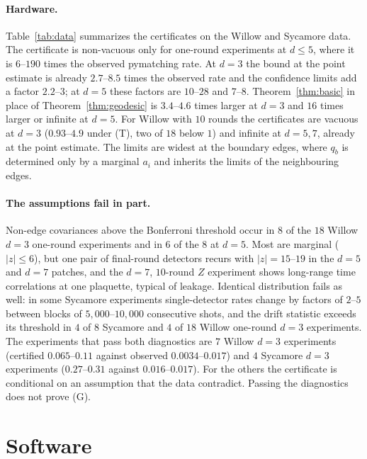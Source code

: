 \documentclass[11pt]{article}
\theoremstyle{plain}
\theoremstyle{definition}
\theoremstyle{remark}
\renewcommand{\_}{\oldunderscore\allowbreak}
\begin{document}
\paragraph{Hardware.} Table~\ref{tab:data} summarizes the certificates on the Willow and Sycamore data. The certificate is non-vacuous only for one-round experiments at $d\le5$, where it is $6$--$190$ times the observed pymatching rate. At $d=3$ the bound at the point estimate is already $2.7$--$8.5$ times the observed rate and the confidence limits add a factor $2.2$--$3$; at $d=5$ these factors are $10$--$28$ and $7$--$8$. Theorem~\ref{thm:basic} in place of Theorem~\ref{thm:geodesic} is $3.4$--$4.6$ times larger at $d=3$ and $16$ times larger or infinite at $d=5$. For Willow with $10$ rounds the certificates are vacuous at $d=3$ ($0.93$--$4.9$ under (T), two of $18$ below $1$) and infinite at $d=5,7$, already at the point estimate. The limits are widest at the boundary edges, where $q_b$ is determined only by a marginal $a_i$ and inherits the limits of the neighbouring edges.

\paragraph{The assumptions fail in part.} Non-edge covariances above the Bonferroni threshold occur in $8$ of the $18$ Willow $d=3$ one-round experiments and in $6$ of the $8$ at $d=5$. Most are marginal ($|z|\le6$), but one pair of final-round detectors recurs with $|z|=15$--$19$ in the $d=5$ and $d=7$ patches, and the $d=7$, $10$-round $Z$ experiment shows long-range time correlations at one plaquette, typical of leakage. Identical distribution fails as well: in some Sycamore experiments single-detector rates change by factors of $2$--$5$ between blocks of $5{,}000$--$10{,}000$ consecutive shots, and the drift statistic exceeds its threshold in $4$ of $8$ Sycamore and $4$ of $18$ Willow one-round $d=3$ experiments. The experiments that pass both diagnostics are $7$ Willow $d=3$ experiments (certified $0.065$--$0.11$ against observed $0.0034$--$0.017$) and $4$ Sycamore $d=3$ experiments ($0.27$--$0.31$ against $0.016$--$0.017$). For the others the certificate is conditional on an assumption that the data contradict. Passing the diagnostics does not prove (G).

\section{Software}\label{sec:software}
\end{document}
